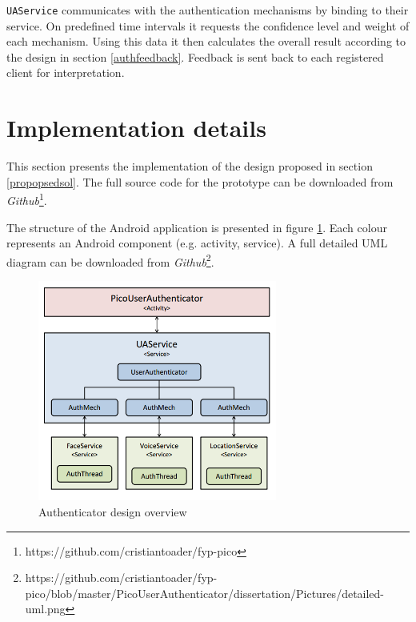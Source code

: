 {\tt UAService} communicates with the authentication mechanisms by binding to their service. On predefined time intervals it requests the confidence level and weight of each mechanism. Using this data it then calculates the overall result according to the design in section \ref{authfeedback}. Feedback is sent back to each registered client for interpretation.

\section{Implementation details}
This section presents the implementation of the design proposed in section \ref{propopsedsol}. The full source code for the prototype can be downloaded from {\em Github}\footnote{https://github.com/cristiantoader/fyp-pico}. 

The structure of the Android application is presented in figure \ref{fig:overview}. Each colour represents an Android component (e.g. activity, service). A full detailed UML diagram can be downloaded from {\em Github}\footnote{https://github.com/cristiantoader/fyp-pico/blob/master/PicoUserAuthenticator/dissertation/Pictures/detailed-uml.png}.
\begin{figure}[h]
    \centering
    \includegraphics[width=0.7\textwidth]{Pictures/overview-uml}
    \caption{Authenticator design overview}
    \label{fig:overview}
\end{figure}

